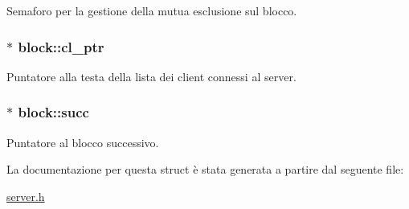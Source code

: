 Semaforo per la gestione della mutua esclusione sul blocco. 

\hypertarget{structblock_8fdcef9d38100ca24b13bd7d90efe54f_8fdcef9d38100ca24b13bd7d90efe54f}{
\subsubsection[{cl\_\-ptr}]{$\ast$ {\bf block::cl\_\-ptr}}}
\label{structblock_8fdcef9d38100ca24b13bd7d90efe54f_8fdcef9d38100ca24b13bd7d90efe54f}


Puntatore alla testa della lista dei client connessi al server. 

\hypertarget{structblock_820194802c67def63d15586d5d9e5fe6_820194802c67def63d15586d5d9e5fe6}{
\subsubsection[{succ}]{$\ast$ {\bf block::succ}}}
\label{structblock_820194802c67def63d15586d5d9e5fe6_820194802c67def63d15586d5d9e5fe6}


Puntatore al blocco successivo. 



La documentazione per questa struct è stata generata a partire dal seguente file:\begin{CompactItemize}
\item 
\hyperlink{server_8h}{server.h}\end{CompactItemize}
